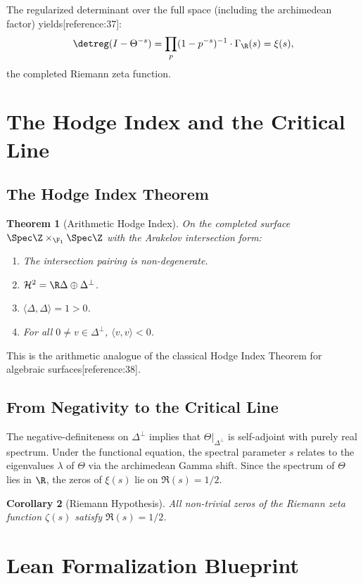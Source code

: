\documentclass[11pt,a4paper]{article}
\newtheorem{theorem}{Theorem}[section]
\newtheorem{corollary}[theorem]{Corollary}
\begin{document}
The regularized determinant over the full space (including the archimedean factor) yields[reference:37]:
\[
\detreg(I - \Theta^{-s}) = \prod_p (1 - p^{-s})^{-1} \cdot \Gamma_{\R}(s) = \xi(s),
\]
the completed Riemann zeta function.

\section{The Hodge Index and the Critical Line}

\subsection{The Hodge Index Theorem}

\begin{theorem}[Arithmetic Hodge Index]
On the completed surface $\Spec \Z \times_{\F_1} \Spec \Z$ with the Arakelov intersection form:
\begin{enumerate}
\item The intersection pairing is non-degenerate.
\item $\mathcal{H}^2 = \R \Delta \oplus \Delta^\perp$.
\item $\langle \Delta, \Delta \rangle = 1 > 0$.
\item For all $0 \ne v \in \Delta^\perp$, $\langle v, v \rangle < 0$.
\end{enumerate}
\end{theorem}

This is the arithmetic analogue of the classical Hodge Index Theorem for algebraic surfaces[reference:38].

\subsection{From Negativity to the Critical Line}

The negative-definiteness on $\Delta^\perp$ implies that $\Theta|_{\Delta^\perp}$ is self-adjoint with purely real spectrum. Under the functional equation, the spectral parameter $s$ relates to the eigenvalues $\lambda$ of $\Theta$ via the archimedean Gamma shift. Since the spectrum of $\Theta$ lies in $\R$, the zeros of $\xi(s)$ lie on $\Re(s) = 1/2$.

\begin{corollary}[Riemann Hypothesis]
All non-trivial zeros of the Riemann zeta function $\zeta(s)$ satisfy $\Re(s) = 1/2$.
\end{corollary}

\section{Lean Formalization Blueprint}
\end{document}

